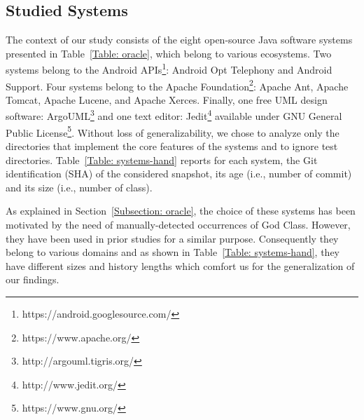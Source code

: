 \subsection{Studied Systems}
\label{subsection: studied systems}
The context of our study consists of the eight open-source Java software systems presented in Table~\ref{Table: oracle}, which belong to various ecosystems. Two systems belong to the Android APIs\footnote{https://android.googlesource.com/}: Android Opt Telephony and Android Support. Four systems belong to the Apache Foundation\footnote{https://www.apache.org/}: Apache Ant, Apache Tomcat, Apache Lucene, and
Apache Xerces. Finally, one free UML design software: ArgoUML\footnote{http://argouml.tigris.org/} and one text editor: Jedit\footnote{http://www.jedit.org/} available under GNU General Public License\footnote{https://www.gnu.org/}. Without loss of generalizability, we chose to analyze only the directories that implement the core features of the systems and to ignore test directories. Table~\ref{Table: systems-hand} reports for each system, the Git identification (SHA) of the considered snapshot, its age (i.e., number of commit) and its size (i.e., number of class).

\begin{table}[htb]
\caption{Characteristics of the Studied Systems}
\label{Table: systems-hand}
\end{table}

As explained in Section~\ref{Subsection: oracle}, the choice of these systems has been motivated by the need of manually-detected occurrences of God Class. However, they have been used in prior studies for a similar purpose. Consequently they belong to various domains and as shown in Table~\ref{Table: systems-hand}, they have different sizes and history lengths which comfort us for the generalization of our findings.


